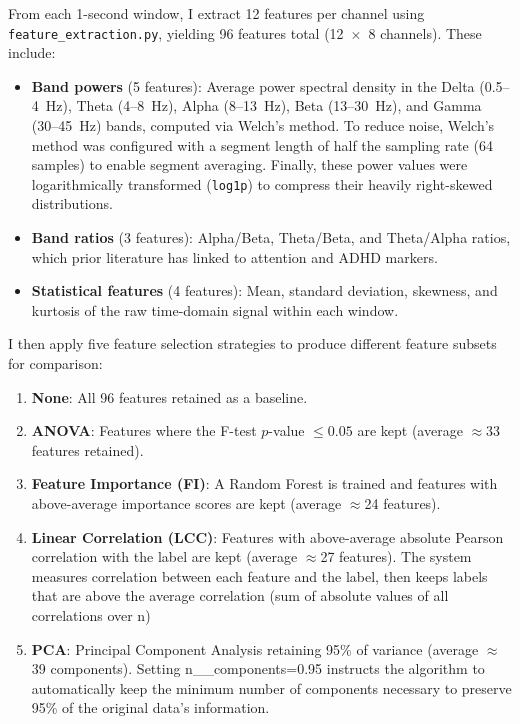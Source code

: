 \documentclass[12pt]{article}
\begin{document}
From each 1-second window, I extract 12 features per channel using \texttt{feature\_extraction.py}, yielding 96 features total (12~$\times$~8 channels). These include:
\begin{itemize}
    \item \textbf{Band powers} (5 features): Average power spectral density in the Delta (0.5--4~Hz), Theta (4--8~Hz), Alpha (8--13~Hz), Beta (13--30~Hz), and Gamma (30--45~Hz) bands, computed via Welch's method. To reduce noise, Welch's method was configured with a segment length of half the sampling rate (64 samples) to enable segment averaging. Finally, these power values were logarithmically transformed (\texttt{log1p}) to compress their heavily right-skewed distributions.
    \item \textbf{Band ratios} (3 features): Alpha/Beta, Theta/Beta, and Theta/Alpha ratios, which prior literature has linked to attention and ADHD markers.
    \item \textbf{Statistical features} (4 features): Mean, standard deviation, skewness, and kurtosis of the raw time-domain signal within each window.
\end{itemize}

I then apply five feature selection strategies to produce different feature subsets for comparison:
\begin{enumerate}
    \item \textbf{None}: All 96 features retained as a baseline.
    \item \textbf{ANOVA}: Features where the F-test $p$-value $\leq 0.05$ are kept (average $\approx$33 features retained).
    \item \textbf{Feature Importance (FI)}: A Random Forest is trained and features with above-average importance scores are kept (average $\approx$24 features).
    \item \textbf{Linear Correlation (LCC)}: Features with above-average absolute Pearson correlation with the label are kept (average $\approx$27 features). The system measures correlation between each feature and the label, then keeps labels that are above the average correlation (sum of absolute values of all correlations over n)
    \item \textbf{PCA}: Principal Component Analysis retaining 95\% of variance (average $\approx$39 components). Setting n\_\_components=0.95 instructs the algorithm to automatically keep the minimum number of components necessary to preserve 95\% of the original data's information.
\end{enumerate}
\end{document}
